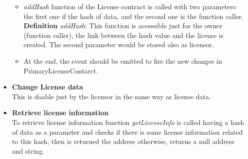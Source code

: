 \begin{itemize}
\begin{itemize}
		\item \textit{addHash} function of the License contract is called with two parameters: the first one if the hash of data, and the second one is the function caller.\\
		\hspace{1cm} \textbf{Definition} \textit{addHash}: This function is accessible just for the owner (function caller), the link between the hash value and the license is created. The second parameter would be stored also as licensor. \\
		\item At the end, the event should be emitted to fire the new changes in PrimaryLicenseContarct.
		
	\end{itemize}
	\item \textbf{Change License data} \\
	This is doable just by the licensor in the same way as license data.  \\
	\item \textbf{Retrieve license information} \\
	To retrieve license information function \textit{getLicenseInfo} is called having a hash of data as a parameter and checks if there is some license information related to this hash, then is returned the address otherwise, returns a null address and string.
	
\end{itemize}
